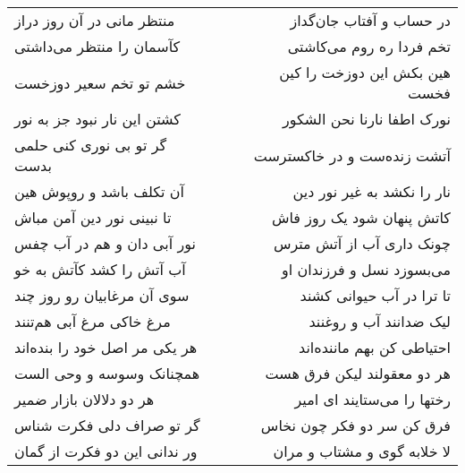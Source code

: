\begin{center}
\begin{longtable}{l p{0.5cm} r}
منتظر مانی در آن روز دراز
&&
در حساب و آفتاب جان‌گداز
\\
کآسمان را منتظر می‌داشتی
&&
تخم فردا ره روم می‌کاشتی
\\
خشم تو تخم سعیر دوزخست
&&
هین بکش این دوزخت را کین فخست
\\
کشتن این نار نبود جز به نور
&&
نورک اطفا نارنا نحن الشکور
\\
گر تو بی نوری کنی حلمی بدست
&&
آتشت زنده‌ست و در خاکسترست
\\
آن تکلف باشد و روپوش هین
&&
نار را نکشد به غیر نور دین
\\
تا نبینی نور دین آمن مباش
&&
کاتش پنهان شود یک روز فاش
\\
نور آبی دان و هم در آب چفس
&&
چونک داری آب از آتش مترس
\\
آب آتش را کشد کآتش به خو
&&
می‌بسوزد نسل و فرزندان او
\\
سوی آن مرغابیان رو روز چند
&&
تا ترا در آب حیوانی کشند
\\
مرغ خاکی مرغ آبی هم‌تنند
&&
لیک ضدانند آب و روغنند
\\
هر یکی مر اصل خود را بنده‌اند
&&
احتیاطی کن بهم ماننده‌اند
\\
همچنانک وسوسه و وحی الست
&&
هر دو معقولند لیکن فرق هست
\\
هر دو دلالان بازار ضمیر
&&
رختها را می‌ستایند ای امیر
\\
گر تو صراف دلی فکرت شناس
&&
فرق کن سر دو فکر چون نخاس
\\
ور ندانی این دو فکرت از گمان
&&
لا خلابه گوی و مشتاب و مران
\\
\end{longtable}
\end{center}
